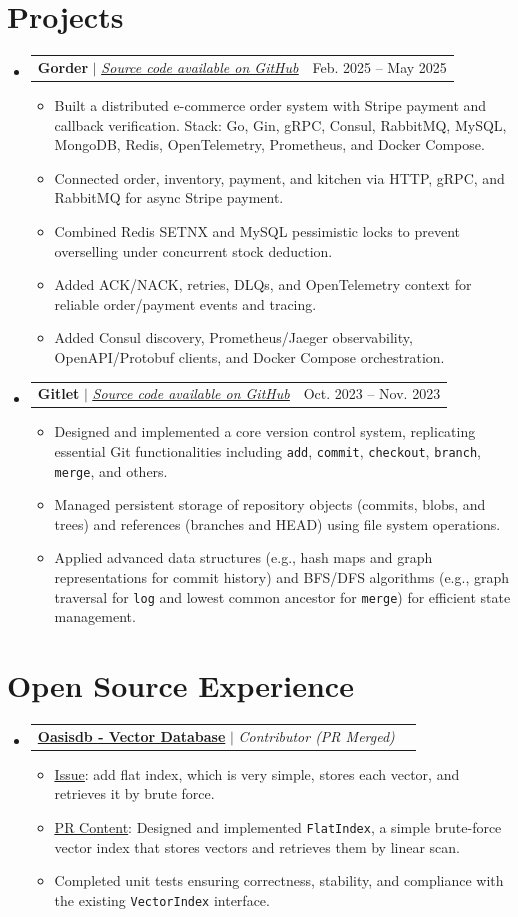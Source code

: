 \documentclass[letterpaper,10pt]{article}
\makeatletter
\newcommand{\resumeItem}[1]{
  \item\small{
    {#1 \vspace{-2pt}}
  }
}
\newcommand{\resumeProjectHeading}[2]{
    \item
    \begin{tabular*}{0.97\textwidth}{l@{\extracolsep{\fill}}r}
      \small#1 & #2 \\
    \end{tabular*}\vspace{-7pt}
}
\newcommand{\resumeSubHeadingListStart}{\begin{itemize}[leftmargin=0.15in, label={}]}
\newcommand{\resumeSubHeadingListEnd}{\end{itemize}}
\newcommand{\resumeItemListStart}{\begin{itemize}}
\newcommand{\resumeItemListEnd}{\end{itemize}\vspace{-5pt}}
\makeatother
\begin{document}
\section{Projects}
    \resumeSubHeadingListStart
      \resumeProjectHeading
          {\textbf{Gorder} $|$ \emph{\href{https://github.com/leebrouse/Gorder}{\underline{Source code available on GitHub}}}}{Feb. 2025 -- May 2025}
          \resumeItemListStart
            \resumeItem{Built a distributed e-commerce order system with Stripe payment and callback verification. Stack: Go, Gin, gRPC, Consul, RabbitMQ, MySQL, MongoDB, Redis, OpenTelemetry, Prometheus, and Docker Compose.}
            \resumeItem{Connected order, inventory, payment, and kitchen via HTTP, gRPC, and RabbitMQ for async Stripe payment.}
            \resumeItem{Combined Redis SETNX and MySQL pessimistic locks to prevent overselling under concurrent stock deduction.}
            \resumeItem{Added ACK/NACK, retries, DLQs, and OpenTelemetry context for reliable order/payment events and tracing.}
            \resumeItem{Added Consul discovery, Prometheus/Jaeger observability, OpenAPI/Protobuf clients, and Docker Compose orchestration.}
          \resumeItemListEnd
      \resumeProjectHeading
          {\textbf{Gitlet} $|$ \emph{\href{https://github.com/leebrouse/Gitlet.git}{\underline{Source code available on GitHub}}}}{Oct. 2023 -- Nov. 2023}
          \resumeItemListStart
            \resumeItem{Designed and implemented a core version control system, replicating essential Git functionalities including \texttt{add}, \texttt{commit}, \texttt{checkout}, \texttt{branch}, \texttt{merge}, and others.}
            \resumeItem{Managed persistent storage of repository objects (commits, blobs, and trees) and references (branches and HEAD) using file system operations.}
            \resumeItem{Applied advanced data structures (e.g., hash maps and graph representations for commit history) and BFS/DFS algorithms (e.g., graph traversal for \texttt{log} and lowest common ancestor for \texttt{merge}) for efficient state management.}
          \resumeItemListEnd
    \resumeSubHeadingListEnd
\section{Open Source Experience}
  \resumeSubHeadingListStart
    \resumeProjectHeading
      {\textbf{\href{https://github.com/lizzy-0323/oasisdb}{Oasisdb - Vector Database}} $|$ \emph{Contributor (PR Merged)}}{}
      \resumeItemListStart
        \resumeItem{\href{https://github.com/lizzy-0323/oasisdb/issues/37}{\underline{Issue}}: add flat index, which is very simple, stores each vector, and retrieves it by brute force.}
        \resumeItem{\href{https://github.com/lizzy-0323/oasisdb/pull/39}{\underline{PR Content}}: Designed and implemented \texttt{FlatIndex}, a simple brute-force vector index that stores vectors and retrieves them by linear scan.}
        \resumeItem{Completed unit tests ensuring correctness, stability, and compliance with the existing \texttt{VectorIndex} interface.}
      \resumeItemListEnd
  \resumeSubHeadingListEnd
\end{document}
